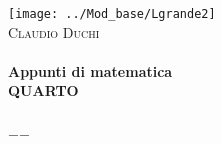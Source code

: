 \frontmatter
\begin{titlepage}
	
	\begin{center}
		
		
			
		\texttt{[image: ../Mod\_base/Lgrande2]}\\[1cm]    
		\textsc{\LARGE Claudio Duchi}\\[1.5cm]
		
		
		
		\HRule \\[0.4cm]
		{ \huge \bfseries Appunti di matematica}\\[0.4cm]
		{\bfseries QUARTO}\\[0.4cm]
		\HRule \\[1.5cm]
		\vfill
		
		{\large $-$\DTMnow$-$}
		
	\end{center}
	
\end{titlepage}
\setcounter{page}{2}

\tableofcontents 
\cleardoublepage
\listoftables
{}
\cleardoublepage
\listoffigures
{}
\cleardoublepage\renewcommand{}
\lstlistoflistings{}
\mainmatter%

\glsaddall
\printglossaries
{}

\printindex

